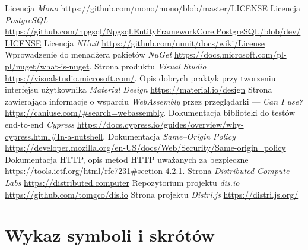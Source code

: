\documentclass[a4paper,11pt,twoside]{report}
\theoremstyle{definition}
\begin{document}
\begin{thebibliography}{35}
     Licencja \emph{Mono} \url{https://github.com/mono/mono/blob/master/LICENSE}
     Licencja \emph{PostgreSQL} \url{https://github.com/npgsql/Npgsql.EntityFrameworkCore.PostgreSQL/blob/dev/LICENSE}
     Licencja \emph{NUnit} \url{https://github.com/nunit/docs/wiki/License}
     Wprowadzenie do menadżera pakietów \emph{NuGet} \url{https://docs.microsoft.com/pl-pl/nuget/what-is-nuget}.
     Strona produktu \emph{Visual Studio} \url{https://visualstudio.microsoft.com/}.
     Opis dobrych praktyk przy tworzeniu interfejsu użytkownika \emph{Material Design} \url{https://material.io/design}
     Strona zawierająca informacje o wsparciu \textit{WebAssembly} przez przeglądarki --- \emph{Can I use?} \url{https://caniuse.com/#search=webassembly}.
     Dokumentacja biblioteki do testów end-to-end \emph{Cypress} \url{https://docs.cypress.io/guides/overview/why-cypress.html#In-a-nutshell}.
     Dokumentacja \emph{Same--Origin Policy} \url{https://developer.mozilla.org/en-US/docs/Web/Security/Same-origin_policy}
     Dokumentacja HTTP, opis metod HTTP uważanych za bezpieczne \url{https://tools.ietf.org/html/rfc7231#section-4.2.1}.
     Strona \emph{Distributed Compute Labs} \url{https://distributed.computer}
     Repozytorium projektu \emph{dis.io} \url{https://github.com/tomgco/dis.io}
     Strona projektu \emph{Distri.js} \url{https://distri.js.org/}
\end{thebibliography}

\thispagestyle{empty}



\chapter*{Wykaz symboli i skrótów}
\end{document}
